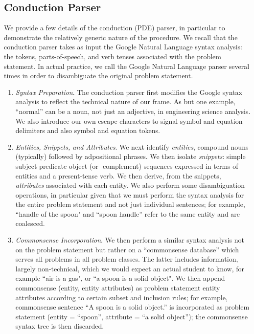 \documentclass[preprint,12pt]{article}
\begin{document}
\subsection{Conduction Parser}
\label{subsec:CP}

We provide a few details of the conduction (PDE) parser, in particular to demonstrate the relatively generic nature of the procedure. We recall that the conduction parser takes as input the Google Natural Language syntax analysis: the tokens, parts-of-speech, and verb tenses associated with the problem statement. In actual practice, we call the Google Natural Language parser several times in order to disambiguate the original problem statement.

\begin{enumerate}
\item {\em Syntax Preparation}. The conduction parser first modifies the Google syntax analysis to reflect the technical nature of our frame. As but one example, ``normal'' can be a noun, not just an adjective, in engineering science analysis. We also introduce our own escape characters to signal symbol and equation delimiters and also symbol and equation tokens.

\item {\em Entities, Snippets, and Attributes}. We next identify {\em entities}, compound nouns (typically) followed by adpositional phrases. We then isolate {\em snippets}: simple subject-predicate-object (or -complement) sequences expressed in terms of entities and a present-tense verb. We then derive, from the snippets, {\em attributes} associated with each entity. We also perform some disambiguation operations, in particular given that we must perform the syntax analysis for the entire problem statement and not just individual sentences;  for example, ``handle of the spoon" and ``spoon handle'' refer to the same entity and are coalesced. 

\item {\em Commonsense Incorporation}. We then perform a similar syntax analysis not on the problem statement but rather on a ``commonsense database'' which serves all problems in all problem classes.  The latter includes information, largely non-technical, which we would expect an actual student to know, for example ``air is a gas", or ``a spoon is a solid object". We then append commonsense (entity, entity attributes) as problem statement entity attributes according to certain subset and  inclusion rules; for example, commonsense sentence ``A spoon is a solid object.'' is incorporated as problem statement (entity = ``spoon'', attribute = ``a solid object''); the commonsense syntax tree is then discarded. 


\end{enumerate}
\end{document}
